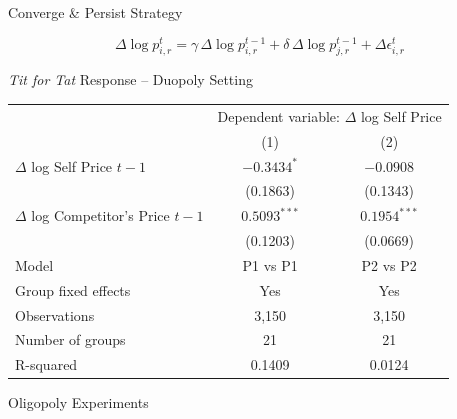 \documentclass[10pt, aspectratio=169]{beamer}
\begin{document}
\begin{frame}{Converge \& Persist Strategy}
\begin{center}
 \begin{tcolorbox}[colback=gray!10, colframe=black, width=0.6\textwidth]
$$\Delta \log p_{i,r}^{t} = \gamma \, \Delta \log p_{i,r}^{t-1} + \delta \, \Delta \log p_{j,r}^{t-1} + \Delta \epsilon_{i,r}^t$$
\end{tcolorbox}   
\end{center}



\centering
\scriptsize %
\begin{threeparttable}
\caption{\emph{Tit for Tat} Response -- Duopoly Setting}
\begin{tabular}{lcc}
\toprule
& \multicolumn{2}{c}{Dependent variable: $\Delta$ log Self Price} \\
\cmidrule(lr){2-3}
& (1) & (2) \\
\midrule
$\Delta$ log Self Price $t-1$         & $-0.3434^{*}$ & $-0.0908$  \\
                             & (0.1863)       & (0.1343)       \\
$\Delta$ log Competitor's Price $t-1$ & $0.5093^{***}$ & $0.1954^{***}$ \\
                             & (0.1203)       & (0.0669)       \\
\midrule
Model                    & P1 vs P1       & P2 vs P2       \\          
Group fixed effects      & Yes            & Yes            \\
Observations             & 3,150          & 3,150          \\
Number of groups         & 21             & 21             \\
R-squared                & 0.1409         & 0.0124         \\
\bottomrule
\end{tabular}
\end{threeparttable}
\end{frame}


\begin{frame}{Oligopoly Experiments}
\begin{figure}[htpb!]
    \centering
    
    \caption{}
    \label{fig:monopoly_convergence}
\end{figure}

\end{frame}
\end{document}
